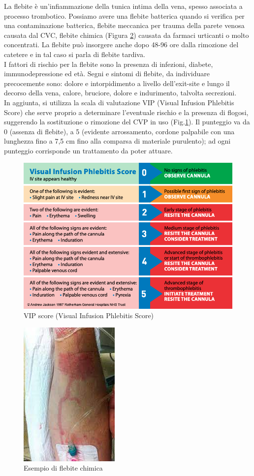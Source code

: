 La flebite è un’infiammazione della tunica intima della vena, spesso associata a processo trombotico. 
Possiamo avere una flebite batterica quando si verifica per una contaminazione batterica, flebite meccanica per 
trauma della parete venosa causata dal CVC, flebite chimica (Figura \ref{fig:FIGURE_4.17}) causata da farmaci urticanti o molto concentrati. 
La flebite può insorgere anche dopo 48-96 ore dalla rimozione del catetere e in tal caso si parla di flebite tardiva.\\ 
I fattori di rischio per la flebite sono la presenza di infezioni, diabete, immunodepressione ed età. 
Segni e sintomi di flebite, da individuare precocemente sono: dolore e intorpidimento a livello dell’exit-site e lungo 
il decorso della vena, 
calore, bruciore, dolore e indurimento, talvolta secrezioni\cite{AIOMCVC}.\\
In aggiunta, si utilizza la scala di valutazione VIP (Visual Infusion Phlebitis Score) che 
serve proprio a determinare l'eventuale rischio e la presenza di flogosi, 
suggerendo la sostituzione o rimozione del CVP in uso (Fig.\ref{fig:FIGURE_4.16}). Il punteggio va da 0 
(assenza di flebite), a 5 (evidente arrossamento, cordone palpabile con una lunghezza fino a 7,5 cm 
fino alla comparsa di materiale purulento); ad ogni punteggio corrisponde un trattamento da poter attuare\cite{FNOPIRIVISTA}.

\begin{figure}[H]
    \begin{center}
    \includegraphics[width=0.4\columnwidth]{img/VIPSCORE.png}
    \vspace{-3mm}
    \end{center}
    \caption{VIP score (Visual Infusion Phlebitis Score)
    \cite{img52}}
    \label{fig:FIGURE_4.16}
\end{figure}

\begin{figure}[H]
    \begin{center}
    \includegraphics[width=0.2\columnwidth]{img/flebite.jpeg}
    \vspace{-3mm}
    \end{center}
    \caption{Esempio di flebite chimica
    \cite{img53}}
    \label{fig:FIGURE_4.17}
\end{figure}

